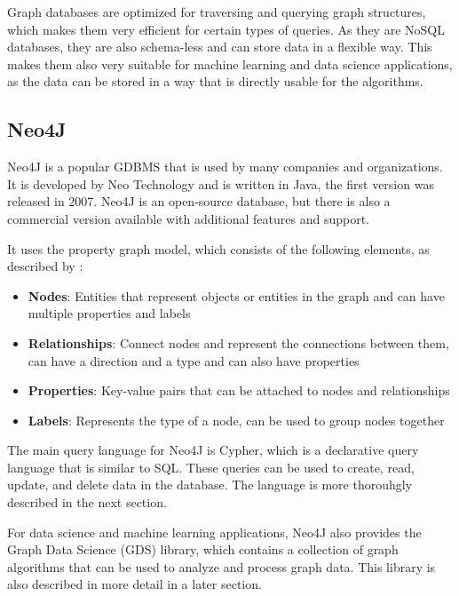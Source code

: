 \documentclass[english,smartquotes,apa]{hgbreport}
\begin{document}
Graph databases are optimized for traversing and querying graph structures, which makes them very efficient for certain types of queries. As they are NoSQL databases, they are also schema-less and can store data in a flexible way. This makes them also very suitable for machine learning and data science applications, as the data can be stored in a way that is directly usable for the algorithms.

\subsection*{Neo4J}

Neo4J is a popular GDBMS that is used by many companies and organizations. It is developed by Neo Technology and is written in Java, the first version was released in 2007. Neo4J is an open-source database, but there is also a commercial version available with additional features and support. \parencite{neo4j}

It uses the property graph model, which consists of the following elements, as described by \cite{lal2015neo4j}:

\begin{itemize}
	\item \textbf{Nodes}: Entities that represent objects or entities in the graph and can have multiple properties and labels
	\item \textbf{Relationships}: Connect nodes and represent the connections between them, can have a direction and a type and can also have properties
	\item \textbf{Properties}: Key-value pairs that can be attached to nodes and relationships
	\item \textbf{Labels}: Represents the type of a node, can be used to group nodes together
\end{itemize}

The main query language for Neo4J is Cypher, which is a declarative query language that is similar to SQL. These queries can be used to create, read, update, and delete data in the database. The language is more thorouhgly described in the next section.

For data science and machine learning applications, Neo4J also provides the Graph Data Science (GDS) library, which contains a collection of graph algorithms that can be used to analyze and process graph data. This library is also described in more detail in a later section.

\end{document}
